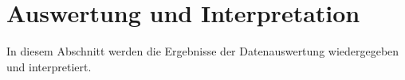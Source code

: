 \section{Auswertung und Interpretation}
\label{sec:interpretation}
In diesem Abschnitt werden die Ergebnisse der Datenauswertung wiedergegeben und interpretiert.
